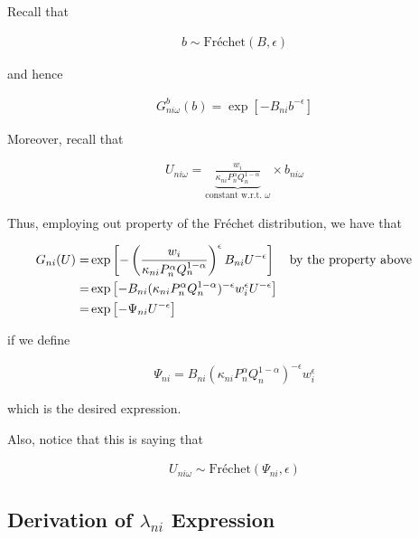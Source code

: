 \documentclass[10pt]{article}
\begin{document}
Recall that

\begin{align}
    b \sim \text{Fréchet}(B, \epsilon)
\end{align}

and hence

\begin{align}
    G^b_{n i \omega}(b)=\exp \left[-B_{n i} b^{-\epsilon}\right]
\end{align}

Moreover, recall that

\begin{align}
    U_{n i \omega}=\underbrace{\frac{w_i}{\kappa_{n i} P_n^\alpha Q_n^{1-\alpha}}}_{\text {constant w.r.t. } \omega} \times b_{n i \omega}
\end{align}

Thus, employing out property of the Fréchet distribution, we have that

\begin{align}
    G_{n i}(U)=&\exp \left[-\left(\frac{w_i}{\kappa_{n i} P_n^\alpha Q_n^{1-\alpha}}\right)^{\epsilon} B_{n i} U^{-\epsilon}\right] && \parbox[t]{4cm}{\raggedright by the property above} \\
    =&\exp \left[-B_{ni} (\kappa_{n i} P_n^\alpha Q_n^{1-\alpha})^{-\epsilon} w_i^\epsilon U^{-\epsilon}\right] \\
    =&\exp \left[- \Psi_{n i} U^{-\epsilon}\right]
\end{align}

if we define

\begin{align}
    \Psi_{ni} = B_{n i} \left(\kappa_{n i} P_n^\alpha Q_n^{1-\alpha}\right)^{-\epsilon} w_i^\epsilon
\end{align}

which is the desired expression.

Also, notice that this is saying that

\begin{align}
    U_{n i \omega} \sim \text{Fréchet}\left(\Psi_{n i}, \epsilon\right) \label{eq:frechet_indirect_utility_sim}
\end{align}


\subsection{Derivation of $\lambda_{n i}$ Expression}
\label{sec:lambda_ni_1}
\end{document}
